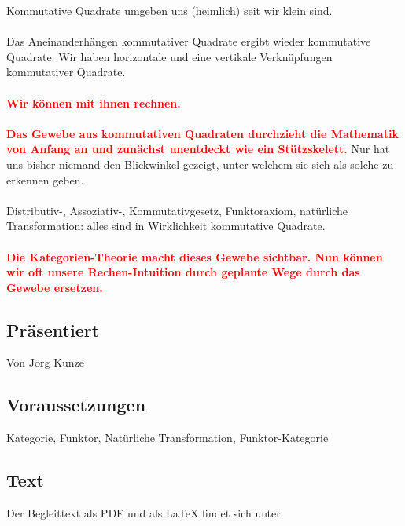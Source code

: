 \documentclass[a4paper]{amsart}
\theoremstyle{definition}
\newcommand{\imporant}[1]{ \textcolor{red}{\textbf{#1}} }
\begin{document}
Kommutative Quadrate umgeben uns (heimlich) seit wir klein sind. 
\\\\
Das Aneinanderhängen kommutativer Quadrate ergibt wieder kommutative Quadrate. Wir haben horizontale und eine vertikale Verknüpfungen kommutativer Quadrate. 
\\\\
\imporant{Wir können mit ihnen rechnen.}
\\\\
\imporant{Das Gewebe aus kommutativen Quadraten durchzieht die Mathematik von Anfang an und zunächst unentdeckt wie ein Stützskelett.} 
Nur hat uns bisher niemand den Blickwinkel gezeigt, unter welchem sie sich als solche zu erkennen geben.
\\\\
Distributiv-, Assoziativ-, Kommutativgesetz, Funktoraxiom, natürliche Transformation: alles sind
in Wirklichkeit kommutative Quadrate.
\\\\
\imporant{Die Kategorien-Theorie macht dieses Gewebe sichtbar. Nun können wir oft unsere Rechen-Intuition durch geplante Wege durch das Gewebe ersetzen.} 



\subsection*{Präsentiert}
Von Jörg Kunze

\subsection*{Voraussetzungen}
Kategorie, Funktor, Natürliche Transformation, Funktor-Kategorie

\subsection*{Text}
Der Begleittext als PDF und als LaTeX findet sich unter
{\tiny
   \url{}
}
\end{document}
